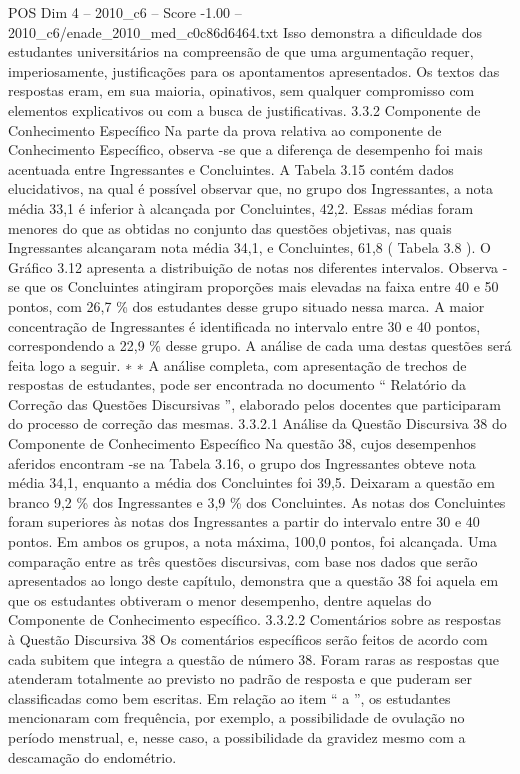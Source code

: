 \begin{textsample}{POS Dim 4 – 2010\_c6 – Score -1.00 – 2010\_c6/enade\_2010\_med\_c0c86d6464.txt}
Isso demonstra a dificuldade dos estudantes universitários na compreensão de que uma argumentação requer, imperiosamente, justificações para os apontamentos apresentados.
Os textos das respostas eram, em sua maioria, opinativos, sem qualquer compromisso com elementos explicativos ou com a busca de justificativas. 3.3.2 Componente de Conhecimento Específico Na parte da prova relativa ao componente de Conhecimento Específico, observa -se que a diferença de desempenho foi mais acentuada entre Ingressantes e Concluintes.
A Tabela 3.15 contém dados elucidativos, na qual é possível observar que, no grupo dos Ingressantes, a nota média 33,1 é inferior à alcançada por Concluintes, 42,2.
Essas médias foram menores do que as obtidas no conjunto das questões objetivas, nas quais Ingressantes alcançaram nota média 34,1, e Concluintes, 61,8 ( Tabela 3.8 ).
O Gráfico 3.12 apresenta a distribuição de notas nos diferentes intervalos.
Observa -se que os Concluintes atingiram proporções mais elevadas na faixa entre 40 e 50 pontos, com 26,7 \% dos estudantes desse grupo situado nessa marca.
A maior concentração de Ingressantes é identificada no intervalo entre 30 e 40 pontos, correspondendo a 22,9 \% desse grupo.
A análise de cada uma destas questões será feita logo a seguir. ∗ ∗ A análise completa, com apresentação de trechos de respostas de estudantes, pode ser encontrada no documento “ Relatório da Correção das Questões Discursivas ”, elaborado pelos docentes que participaram do processo de correção das mesmas. 3.3.2.1 Análise da Questão Discursiva 38 do Componente de Conhecimento Específico Na questão 38, cujos desempenhos aferidos encontram -se na Tabela 3.16, o grupo dos Ingressantes obteve nota média 34,1, enquanto a média dos Concluintes foi 39,5.
Deixaram a questão em branco 9,2 \% dos Ingressantes e 3,9 \% dos Concluintes.
As notas dos Concluintes foram superiores às notas dos Ingressantes a partir do intervalo entre 30 e 40 pontos.
Em ambos os grupos, a nota máxima, 100,0 pontos, foi alcançada.
Uma comparação entre as três questões discursivas, com base nos dados que serão apresentados ao longo deste capítulo, demonstra que a questão 38 foi aquela em que os estudantes obtiveram o menor desempenho, dentre aquelas do Componente de Conhecimento específico. 3.3.2.2 Comentários sobre as respostas à Questão Discursiva 38 Os comentários específicos serão feitos de acordo com cada subitem que integra a questão de número 38.
Foram raras as respostas que atenderam totalmente ao previsto no padrão de resposta e que puderam ser classificadas como bem escritas.
Em relação ao item “ a ”, os estudantes mencionaram com frequência, por exemplo, a possibilidade de ovulação no período menstrual, e, nesse caso, a possibilidade da gravidez mesmo com a descamação do endométrio.

\end{textsample}
